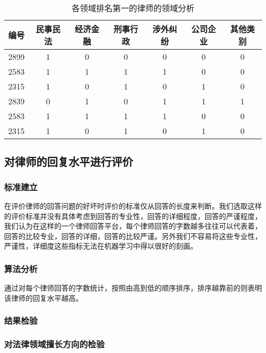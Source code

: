 \documentclass[bwprint]{cumcmthesis}
\begin{document}
\begin{table}[!htp]
\center
\caption{各领域排名第一的律师的领域分析}
\label{各领域排名第一的律师的领域分析}
    \begin{tabular}{|c|c|c|c|c|c|c|}
    \hline
    编号   & 民事民法 & 经济金融 & 刑事行政 & 涉外纠纷 & 公司企业 & 其他类别 \\ \hline
    2899 & 1    & 0    & 0    & 0    & 0    & 0    \\ \hline
    2583 & 1    & 1    & 1    & 1    & 0    & 0    \\ \hline
    2315 & 1    & 0    & 1    & 0    & 1    & 0    \\ \hline
    2839 & 0    & 1    & 0    & 1    & 1    & 1    \\ \hline
    2583 & 1    & 1    & 1    & 1    & 0    & 0    \\ \hline
    2315 & 1    & 0    & 1    & 0    & 1    & 0    \\ \hline
    \end{tabular}
\end{table}

\subsection{对律师的回复水平进行评价}
\subsubsection{标准建立}
在评价律师的回答问题的好坏时评价的标准仅从回答的长度来判断。我们选取这样的评价标准并没有具体考虑到回答的专业性，回答的详细程度，回答的严谨程度，我们认为在这样的一个律师回答平台，每个律师回答的字数越多往往可以代表着，回答的比较专业，回答的详细，回答的比较严谨。另外我们不容易将这些专业性，严谨性，详细度这些指标无法在机器学习中得以很好的刻画。
\subsubsection{算法分析}

通过对每个律师回答的字数统计，按照由高到低的顺序排序，排序越靠前的则表明该律师的回复水平越高。

\subsubsection{结果检验}

\subsubsection*{对法律领域擅长方向的检验}
\end{document}
